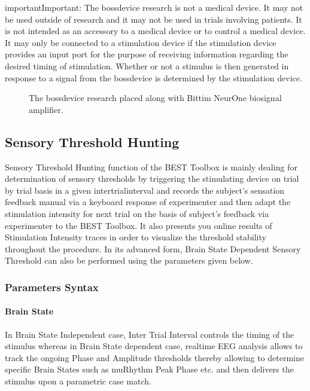 \documentclass[letterpaper,10pt,english]{sphinxmanual}
\begin{document}
\begin{sphinxadmonition}{important}{Important:}
\sphinxAtStartPar
The bossdevice research is not a medical device. It may not be used outside of research and it may not be used in trials involving patients. It is not intended as an accessory to a medical device or to control a medical device. It may only be connected to a stimulation device if the stimulation device provides an input port for the purpose of receiving information regarding the desired timing of stimulation. Whether or not a stimulus is then generated in response to a signal from the bossdevice is determined by the stimulation device.
\end{sphinxadmonition}

\begin{figure}[htbp]
\centering
\capstart

\noindent{}
\caption{The bossdevice research placed along with Bittim NeurOne biosignal amplifier.}\label{\detokenize{14_TMSfMRIMeasurement:id1}}\end{figure}


\subsection{Sensory Threshold Hunting}
\label{\detokenize{15_SensoryThresholdHunting:sensory-threshold-hunting}}\label{\detokenize{15_SensoryThresholdHunting::doc}}
\sphinxAtStartPar
Sensory Threshold Hunting function of the BEST Toolbox is mainly dealing for determination of sensory thresholds by triggering the stimulating device on trial by trial basis in a given inter\sphinxhyphen{}trial\sphinxhyphen{}interval and records the subject’s sensation feedback manual via a keyboard response of experimenter and then adapt the stimulation intensity for next trial on the basis of subject’s feedback via experimenter to the BEST Toolbox. It also presents you online results of Stimulation Intensity traces in order to visualize the threshold stability throughout the procedure. In its advanced form, Brain State\sphinxhyphen{} Dependent Sensory Threshold can also be performed using the parameters given below.


\subsubsection{Parameters Syntax}
\label{\detokenize{15_SensoryThresholdHunting:parameters-syntax}}

\paragraph{Brain State}
\label{\detokenize{15_SensoryThresholdHunting:brain-state}}
\sphinxAtStartPar
In Brain State Independent case, Inter Trial Interval controls the timing of the stimulus whereas in Brain State dependent case, real\sphinxhyphen{}time EEG analysis allows to track the ongoing Phase and Amplitude thresholds thereby allowing to determine specific Brain States such as mu\sphinxhyphen{}Rhythm Peak Phase etc. and then delivers the stimulus upon a parametric case match.
\end{document}
